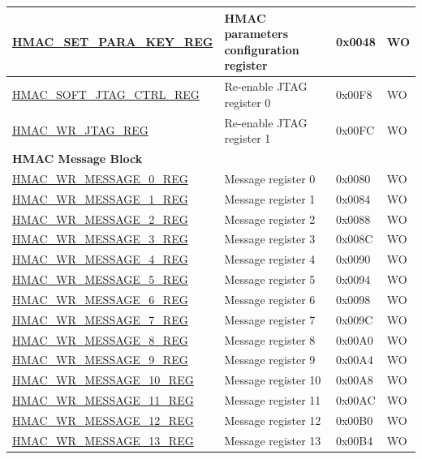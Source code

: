 \begin{longtable}{ | p{6cm} | p{7.2cm} | p{1.3cm} | p{1cm} | }
\hyperref[regdesc:HMACSETPARAKEYREG]{HMAC\_SET\_PARA\_KEY\_REG} & HMAC parameters configuration register & 0x0048 & WO \\ \hline
\hyperref[regdesc:HMACSOFTJTAGCTRLREG]{HMAC\_SOFT\_JTAG\_CTRL\_REG} & Re-enable JTAG register 0 & 0x00F8 & WO
\\ \hline
\hyperref[regdesc:HMACWRJTAGREG]{HMAC\_WR\_JTAG\_REG} & Re-enable JTAG register 1 & 0x00FC & WO \\ \hline
\multicolumn{4}{|l|}{\textbf{HMAC Message Block}} \\ \hline
\hyperref[regdesc:HMACWRMESSAGENREG]{HMAC\_WR\_MESSAGE\_0\_REG} & Message register 0 & 0x0080 & WO \\ \hline
\hyperref[regdesc:HMACWRMESSAGENREG]{HMAC\_WR\_MESSAGE\_1\_REG} & Message register 1 & 0x0084 & WO \\ \hline
\hyperref[regdesc:HMACWRMESSAGENREG]{HMAC\_WR\_MESSAGE\_2\_REG} & Message register 2 & 0x0088 & WO \\ \hline
\hyperref[regdesc:HMACWRMESSAGENREG]{HMAC\_WR\_MESSAGE\_3\_REG} & Message register 3 & 0x008C & WO \\ \hline
\hyperref[regdesc:HMACWRMESSAGENREG]{HMAC\_WR\_MESSAGE\_4\_REG} & Message register 4 & 0x0090 & WO \\ \hline
\hyperref[regdesc:HMACWRMESSAGENREG]{HMAC\_WR\_MESSAGE\_5\_REG} & Message register 5 & 0x0094 & WO \\ \hline
\hyperref[regdesc:HMACWRMESSAGENREG]{HMAC\_WR\_MESSAGE\_6\_REG} & Message register 6 & 0x0098 & WO \\ \hline
\hyperref[regdesc:HMACWRMESSAGENREG]{HMAC\_WR\_MESSAGE\_7\_REG} & Message register 7 & 0x009C & WO \\ \hline
\hyperref[regdesc:HMACWRMESSAGENREG]{HMAC\_WR\_MESSAGE\_8\_REG} & Message register 8 & 0x00A0 & WO \\ \hline
\hyperref[regdesc:HMACWRMESSAGENREG]{HMAC\_WR\_MESSAGE\_9\_REG} & Message register 9 & 0x00A4 & WO \\ \hline
\hyperref[regdesc:HMACWRMESSAGENREG]{HMAC\_WR\_MESSAGE\_10\_REG} & Message register 10 & 0x00A8 & WO \\ \hline
\hyperref[regdesc:HMACWRMESSAGENREG]{HMAC\_WR\_MESSAGE\_11\_REG} & Message register 11 & 0x00AC & WO \\ \hline
\hyperref[regdesc:HMACWRMESSAGENREG]{HMAC\_WR\_MESSAGE\_12\_REG} & Message register 12 & 0x00B0 & WO \\ \hline
\hyperref[regdesc:HMACWRMESSAGENREG]{HMAC\_WR\_MESSAGE\_13\_REG} & Message register 13 & 0x00B4 & WO \\ \hline

\end{longtable}
